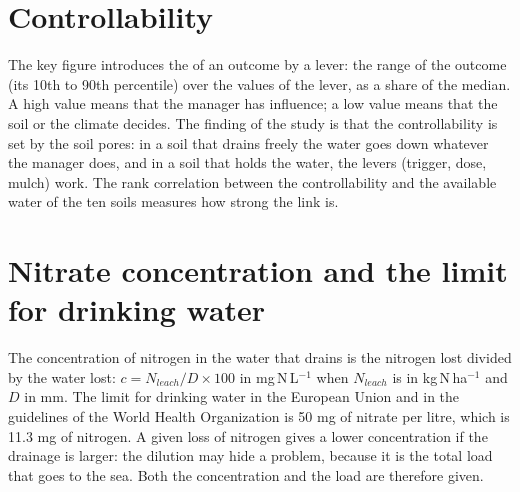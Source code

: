 \section{Controllability}
The key figure introduces the  of an outcome by a lever: the range of the outcome (its 10th to 90th percentile) over the values of the lever, as a share of the median. A high value means that the manager has influence; a low value means that the soil or the climate decides. The finding of the study is that the controllability is set by the soil pores: in a soil that drains freely the water goes down whatever the manager does, and in a soil that holds the water, the levers (trigger, dose, mulch) work. The rank correlation between the controllability and the available water of the ten soils measures how strong the link is.

\section{Nitrate concentration and the limit for drinking water}
The concentration of nitrogen in the water that drains is the nitrogen lost divided by the water lost: $c=N_{leach}/D\times100$ in mg\,N\,L$^{-1}$ when $N_{leach}$ is in kg\,N\,ha$^{-1}$ and $D$ in mm. The limit for drinking water in the European Union and in the guidelines of the World Health Organization is 50 mg of nitrate per litre, which is 11.3 mg of nitrogen. A given loss of nitrogen gives a lower concentration if the drainage is larger: the dilution may hide a problem, because it is the total load that goes to the sea. Both the concentration and the load are therefore given.
